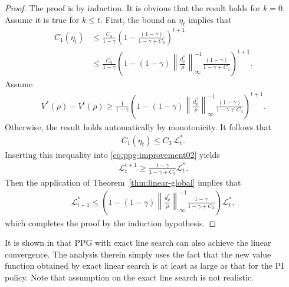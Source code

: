 \begin{proof}
    The proof is by induction. It is obvious that the result  holds for $k=0$. Assume it is true for $k\leq t$. First, the bound on $\eta_t$ implies that
    \begin{align*}
C_1(\eta_t)&\leq \frac{C_3}{1-\gamma}\left(1-\frac{(1-\gamma)}{1-\gamma+C_3}\right)^{t+1}\\
&\leq \frac{C_3}{1-\gamma}\left(1-(1-\gamma)\left\|\frac{d_\rho^*}{\rho}\right\|_\infty^{-1}\frac{(1-\gamma)}{1-\gamma+C_3}\right)^{t+1}.
\end{align*}
Assume 
\begin{align*}
V^*(\rho)-V^t(\rho)\geq\frac{1}{1-\gamma}\left(1-(1-\gamma)\left\|\frac{d_\rho^*}{\rho}\right\|_\infty^{-1}\frac{(1-\gamma)}{1-\gamma+C_3}\right)^{t+1}.
\end{align*}
Otherwise, the result holds automatically by monotonicity. It follows that 
\begin{align*}
C_1(\eta_t)\leq C_3\,\mathcal{L}_t^*.
\end{align*}
Inserting this inequality into 
\eqref{eq:ppg-improvement02}
yields 
\begin{align*}
\mathcal{L}_t^{t+1}\geq \frac{1-\gamma}{1-\gamma+C_3}\mathcal{L}_t^*.
\end{align*}
Then the application of Theorem~\ref{thm:linear-global} implies that 
\begin{align*}
\mathcal{L}_{t+1}^*\leq \left(1-(1-\gamma)\left\|\frac{d_\rho^*}{\rho}\right\|_\infty^{-1}\frac{1-\gamma}{1-\gamma+C_3}\right)\mathcal{L}_t^*,
\end{align*}
which completes the proof by the  induction hypothesis.
\end{proof}
\begin{remark}
    It is shown in \textup{\cite{Bhandari_Russo_2021}} that PPG with exact line search can also achieve the linear convergence. The analysis therein simply uses the fact that the new value function obtained by exact linear search is at least as large as that for the PI policy. Note that assumption on the exact line search is not realistic.
\end{remark}